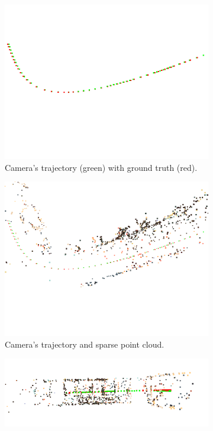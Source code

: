 \begin{figure}[h]
\centering
\begin{subfigure}{0.45\linewidth}
\includegraphics[width=\linewidth]{img/snapshot00.png}
\caption{Camera's trajectory (green) with ground truth (red).}
\label{fig:trajectory1}
\end{subfigure}
\begin{subfigure}{0.45\linewidth}
\includegraphics[width=\linewidth]{img/snapshot01.png}
\caption{Camera's trajectory and sparse point cloud.}
\label{fig:trajectory2}
\end{subfigure}
\begin{subfigure}{\linewidth}
\includegraphics[width=0.8\linewidth]{img/snapshot02.png}

\end{subfigure}
\end{figure}

